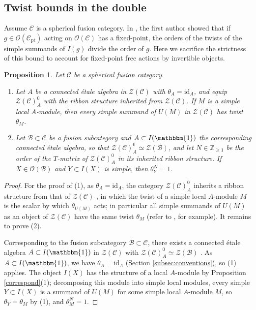 \documentclass[10pt]{article}
\theoremstyle{plain}
\newtheorem{proposition}[theorem]{Proposition}
\theoremstyle{definition}
\theoremstyle{plain}
\begin{document}

\subsection{Twist bounds in the double}

\par Assume $\mathcal{C}$ is a spherical fusion category. In \cite{MR4655273}, the first author showed that if $g\in\mathcal{O}(\mathcal{C}_\mathrm{pt})$ acting on $\mathcal{O}(\mathcal{C})$ has a fixed-point, the orders of the twists of the simple summands of $I(g)$ divide the order of $g$. Here we sacrifice the strictness of this bound to account for fixed-point free actions by invertible objects.

\begin{proposition}\label{twist}
    Let $\mathcal{C}$ be a spherical fusion category.
    \begin{enumerate}
    \item Let $A$ be a connected \'etale algebra in $\mathcal{Z}(\mathcal{C})$ with $\theta_A=\mathrm{id}_A$, and equip $\mathcal{Z}(\mathcal{C})_A^0$ with the ribbon structure inherited from $\mathcal{Z}(\mathcal{C})$. If $M$ is a simple local $A$-module, then every simple summand of $U(M)$ in $\mathcal{Z}(\mathcal{C})$ has twist $\theta_M$.
    \item Let $\mathcal{B}\subset\mathcal{C}$ be a fusion subcategory and $A\subset I(\mathbbm{1})$ the corresponding connected \'etale algebra, so that $\mathcal{Z}(\mathcal{C})_A^0\simeq\mathcal{Z}(\mathcal{B})$, and let $N\in\mathbb{Z}_{\geq1}$ be the order of the $T$-matrix of $\mathcal{Z}(\mathcal{C})_A^0$ in its inherited ribbon structure. If $X\in\mathcal{O}(\mathcal{B})$ and $Y\subset I(X)$ is simple, then $\theta_Y^N=1$.
    \end{enumerate}
\end{proposition}

\begin{proof}
For the proof of (1), as $\theta_A=\mathrm{id}_A$, the category $\mathcal{Z}(\mathcal{C})_A^0$ inherits a ribbon structure from that of $\mathcal{Z}(\mathcal{C})$ \cite[Theorem 1.17]{MR1936496}, in which the twist of a simple local $A$-module $M$ is the scalar by which $\theta_{U(M)}$ acts; in particular all simple summands of $U(M)$ as an object of $\mathcal{Z}(\mathcal{C})$ have the same twist $\theta_M$ (refer to \cite[Lemma 5.2(b)]{MR3997136}, for example). It remains to prove (2).

Corresponding to the fusion subcategory $\mathcal{B}\subset\mathcal{C}$, there exists a connected \'etale algebra $A\subset I(\mathbbm{1})$ in $\mathcal{Z}(\mathcal{C})$ with $\mathcal{Z}(\mathcal{C})_A^0\simeq\mathcal{Z}(\mathcal{B})$ \cite[Theorem 4.10 and its proof]{MR3039775}. As $A\subset I(\mathbbm{1})$, we have $\theta_A=\mathrm{id}_A$ (Section \ref{subsec:conventions}), so (1) applies. The object $I(X)$ has the structure of a local $A$-module by Proposition \ref{correspond}(1); decomposing this module into simple local modules, every simple $Y\subset I(X)$ is a summand of $U(M)$ for some simple local $A$-module $M$, so $\theta_Y=\theta_M$ by (1), and $\theta_M^N=1$.
\end{proof}
\end{document}
